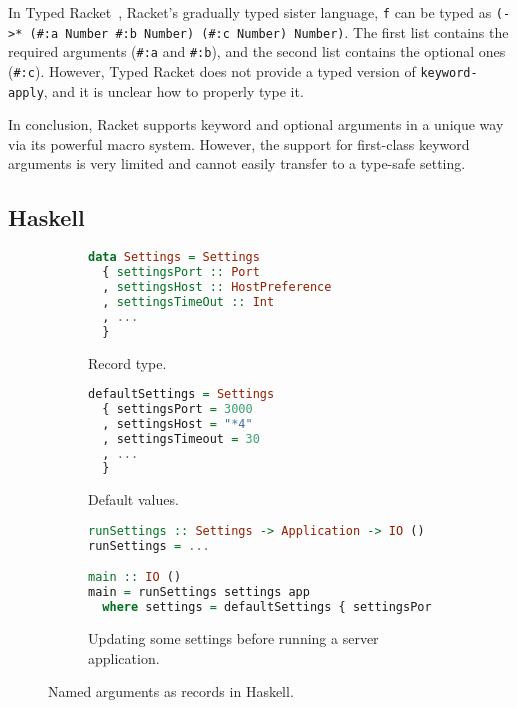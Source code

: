 In Typed Racket~\citep{typedracket}, Racket's gradually typed sister language,
\lstinline{f} can be typed as
\lstinline[language=Racket]{(->* (#:a Number #:b Number) (#:c Number) Number)}.
The first list contains the required arguments
(\lstinline[language=Racket]{#:a} and \lstinline[language=Racket]{#:b}), and the
second list contains the optional ones (\lstinline[language=Racket]{#:c}). However,
Typed Racket does not provide a typed version of
\lstinline[language=Racket]{keyword-apply}, and it is unclear how to properly type it.

In conclusion, Racket supports keyword and optional arguments in a unique way
via its powerful macro system. However, the support for first-class keyword arguments
is very limited and cannot easily transfer to a type-safe setting.

\subsection{Haskell}

\begin{figure}
\begin{subfigure}{0.45\textwidth}
\begin{lstlisting}[language=Haskell]
data Settings = Settings
  { settingsPort :: Port
  , settingsHost :: HostPreference
  , settingsTimeOut :: Int
  , ...
  }
\end{lstlisting}
\caption{Record type.} \label{fig:settings}
\end{subfigure}
\hfill
\begin{subfigure}{0.35\textwidth}
\begin{lstlisting}[language=Haskell]
defaultSettings = Settings
  { settingsPort = 3000
  , settingsHost = "*4"
  , settingsTimeout = 30
  , ...
  }
\end{lstlisting}
\caption{Default values.} \label{fig:default}
\end{subfigure}
\par\bigskip
\begin{subfigure}{\textwidth}
\begin{lstlisting}[language=Haskell]
runSettings :: Settings -> Application -> IO ()
runSettings = ...

main :: IO ()
main = runSettings settings app
  where settings = defaultSettings { settingsPort = 4000, settingsHost = "*6" }
\end{lstlisting}
\caption{Updating some settings before running a server application.} \label{fig:update}
\end{subfigure}
\caption{Named arguments as records in Haskell.}
\end{figure}

